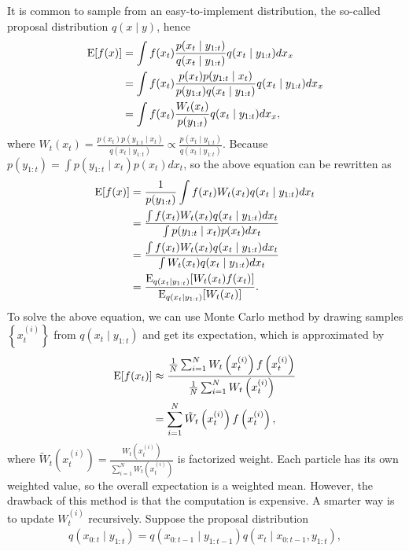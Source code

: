 It is common to sample from an easy-to-implement distribution, the so-called proposal distribution $q(x\mid y)$, hence
\begin{align*}
\mathrm{E}\lbrack f(x) \rbrack &= \int f(x_t )\frac{p(x_t \mid y_{1:t})}{q(x_t \mid y_{1:t})} q(x_t \mid y_{1:t})dx_x\\
&= \int f(x_t )\frac{p(x_t )p(y_{1:t}\mid x_t )}{p(y_{1:t})q(x_t \mid y_{1:t})} q(x_t \mid y_{1:t})dx_x\\
&= \int f(x_t )\frac{W_t (x_t )}{p(y_{1:t})} q(x_t \mid y_{1:t})dx_x,
\end{align*}
where $W_t (x_t )=\frac{p(x_t )p(y_{1:t}\mid x_t )}{q(x_t \mid y_{1:t})} \propto \frac{p(x_t \mid y_{1:t})}{q(x_t \mid y_{1:t})}$. Because $p(y_{1:t})=\int p(y_{1:t}\mid x_t )p(x_t )dx_t $, so the above equation can be rewritten as
\begin{align*}
\mathrm{E}\lbrack f(x)\rbrack&= \frac{1}{p(y_{1:t})}\int f(x_t )W_t (x_t )q(x_t \mid y_{1:t})dx_t \\
&= \frac{ \int f(x_t )W_t (x_t )q(x_t \mid y_{1:t})dx_t  }{\int p(y_{1:t}\mid x_t )p(x_t )dx_t } \\
&= \frac{ \int f(x_t )W_t (x_t )q(x_t \mid y_{1:t})dx_t  }{\int W_t (x_t )q(x_t \mid y_{1:t})dx_t } \\
&= \frac{\mathrm{E}_{q(x_t \mid y_{1:t})}[W_t (x_t )f(x_t )]}{\mathrm{E}_{q(x_t \mid y_{1:t})}[W_t (x_t )]}.
\end{align*}
To solve the above equation, we can use Monte Carlo method by drawing samples $\left\lbrace x_t^{(i)}\right\rbrace$ from $q(x_t \mid y_{1:t})$ and get its expectation, which is approximated by 
\begin{align}\label{PFexpectation}
\begin{split}
\mathrm{E}\lbrack f(x_t )\rbrack &\approx \frac{\frac{1}{N} \sum_{i=1}^{N} W_t\left(x_t^{(i)}\right)f\left(x_t^{(i)}\right)} {\frac{1}{N} \sum_{i=1}^{N} W_t\left(x_t^{(i)}\right)}\\
&= \sum_{i=1}^{N} \tilde{W}_t\left(x_t^{(i)}\right)f\left(x_t^{(i)}\right),
\end{split}
\end{align}
where $\tilde{W}_t\left(x_t^{(i)}\right) = \frac{ W_t\left(x_t^{(i)}\right)}{\sum_{i=1}^NW_t\left(x_t^{(i)}\right)}$ is factorized weight. Each particle has its own weighted value, so the overall expectation is a weighted mean. However, the drawback of this method is that the computation is expensive. A smarter way is to update $W_t^{(i)}$ recursively. Suppose the proposal distribution 
\begin{align*}
q(x_{0:t}\mid y_{1:t}) = q(x_{0:t-1}\mid y_{1:t-1}) q(x_t \mid  x_{0:t-1},y_{1:t}),
\end{align*}
